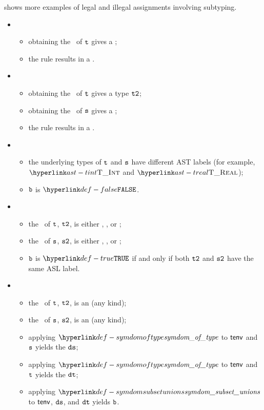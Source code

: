 shows more examples of legal and illegal assignments involving
subtyping.

\ProseParagraph
\OneApplies
\begin{itemize}
\item {}
  \begin{itemize}
  \item obtaining the \underlyingtype\ of $\texttt{t}$ gives a \typingerrorterm{};
  \item the rule results in a \typingerrorterm{}.
  \end{itemize}

\item {}
  \begin{itemize}
    \item obtaining the \underlyingtype\ of $\texttt{t}$ gives a type $\texttt{t2}$;
    \item obtaining the \underlyingtype\ of $\texttt{s}$ gives a \typingerrorterm{};
    \item the rule results in a \typingerrorterm{}.
    \end{itemize}

\item {}
  \begin{itemize}
  \item the underlying types of $\texttt{t}$ and $\texttt{s}$ have different AST labels
  (for example, $\TInt$ and $\TReal$);
  \item $\texttt{b}$ is $\False$.
  \end{itemize}

\item {}
  \begin{itemize}
  \item the \underlyingtype\ of $\texttt{t}$, $\texttt{t2}$, is either \realtypeterm{}, \stringtypeterm{}, or \booleantypeterm{};
  \item the \underlyingtype\ of $\texttt{s}$, $\texttt{s2}$, is either \realtypeterm{}, \stringtypeterm{}, or \booleantypeterm{};
  \item $\texttt{b}$ is $\True$ if and only if both $\texttt{t2}$ and $\texttt{s2}$ have the same ASL label.
  \end{itemize}

\item {}
  \begin{itemize}
  \item the \underlyingtype\ of $\texttt{t}$, $\texttt{t2}$, is an \integertypeterm{} (any kind);
  \item the \underlyingtype\ of $\texttt{s}$, $\texttt{s2}$, is an \integertypeterm{} (any kind);
  \item applying $\symdomoftype$ to $\textsf{tenv}$ and $\texttt{s}$ yields the \symbolicdomain{} $\texttt{ds}$;
  \item applying $\symdomoftype$ to $\textsf{tenv}$ and $\texttt{t}$ yields the \symbolicdomain{} $\texttt{dt}$;
  \item applying $\symdomsubsetunions$ to $\textsf{tenv}$, $\texttt{ds}$, and $\texttt{dt}$ yields $\texttt{b}$.
  \end{itemize}


\end{itemize}
